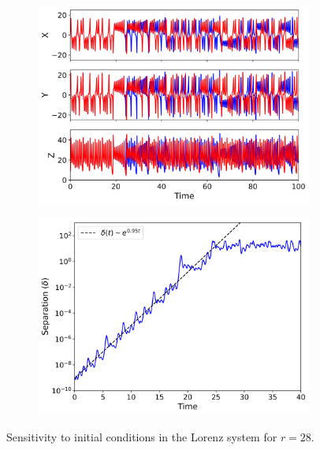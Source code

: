 \documentclass[paper=a4, fontsize=11pt]{scrartcl}
\numberwithin{equation}{section}		%
\numberwithin{figure}{section}			%
\numberwithin{table}{section}				%
\begin{document}
\begin{figure}[hbt!]
	\begin{subfigure}[b]{0.495\textwidth}
		\centering
		\includegraphics[width=\textwidth]{media/sensitivity_28.00.png}
		\caption{}
		\label{fig:sub1}
	\end{subfigure}
	\hfill
	\begin{subfigure}[b]{0.495\textwidth}
		\centering
		\includegraphics[width=\textwidth]{media/separation_28.00.png}
		\caption{}
		\label{fig:sub2}
	\end{subfigure}
	
	\caption{Sensitivity to initial conditions in the Lorenz system for \( r = 28 \).}
	\label{fig:sensitivity}
\end{figure}
\end{document}
